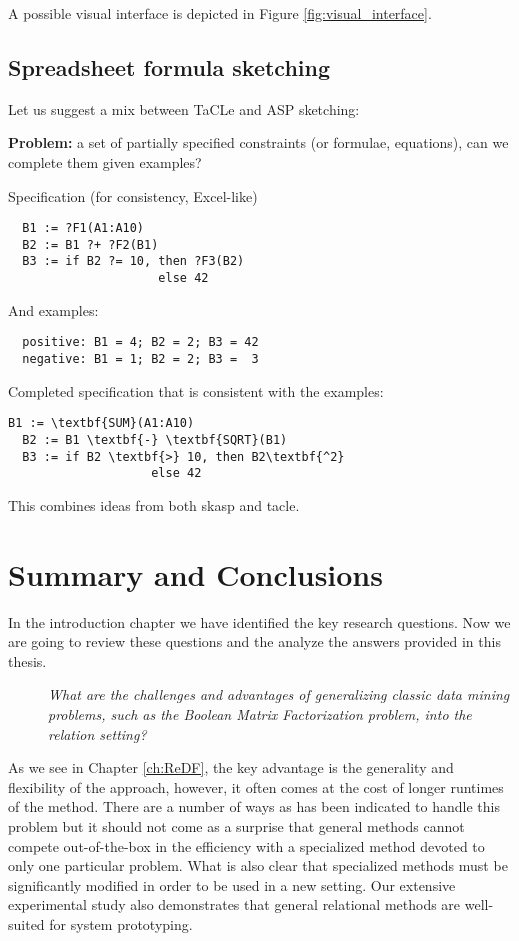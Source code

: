 A possible visual interface is depicted in Figure \ref{fig:visual_interface}.

\subsection{Spreadsheet formula sketching}
Let us suggest a mix between TaCLe and ASP sketching:

\textbf{Problem:} a set of partially specified constraints (or formulae, equations), can we complete them given examples?
 
  Specification (for consistency, Excel-like)
  \begin{verbatim}
  B1 := ?F1(A1:A10)
  B2 := B1 ?+ ?F2(B1)
  B3 := if B2 ?= 10, then ?F3(B2)
                     else 42
  \end{verbatim}
  And examples:
  \begin{verbatim}
  positive: B1 = 4; B2 = 2; B3 = 42 
  negative: B1 = 1; B2 = 2; B3 =  3
  \end{verbatim}
  

  Completed specification that is consistent with the examples:
  \begin{Verbatim}[commandchars=\\\{\}]
  B1 := \textbf{SUM}(A1:A10)
  B2 := B1 \textbf{-} \textbf{SQRT}(B1)
  B3 := if B2 \textbf{>} 10, then B2\textbf{^2}
                    else 42
  \end{Verbatim}

This combines ideas from both \acrshort{skasp} and \acrshort{tacle}.
  

\section{Summary and Conclusions}
In the introduction chapter we have identified the key research
questions. Now we are going to review these questions and the analyze the answers provided in this thesis.

\begin{description}
\item[\cone] \textit{What are the challenges and advantages of generalizing
    classic data mining problems, such as the Boolean Matrix
  Factorization problem, into the relation setting?}
\end{description}

As we see in Chapter \ref{ch:ReDF}, the key advantage is the
generality and flexibility of the approach, however, it often comes at
the cost of longer runtimes of the method. There are a number of ways
as has been indicated to handle this problem but it should not come as
a surprise that general methods cannot compete out-of-the-box in the efficiency with
a specialized method devoted to only one particular problem. What is
also clear that specialized methods must be significantly modified in
order to be used in a new setting. Our extensive experimental study
also demonstrates that general relational methods are well-suited for
system prototyping.


